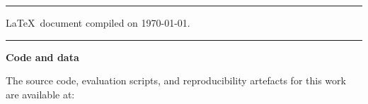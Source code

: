 \mbox{}
\vfill

{\small\onehalfspacing
\begin{center}

\noindent\rule{\textwidth}{1pt}

    \LaTeX~document compiled on \today.

\noindent\rule{\textwidth}{.2pt}

    \textbf{Code and data}

    The source code, evaluation scripts, and reproducibility artefacts
    for this work are available at:


\end{center}
}
